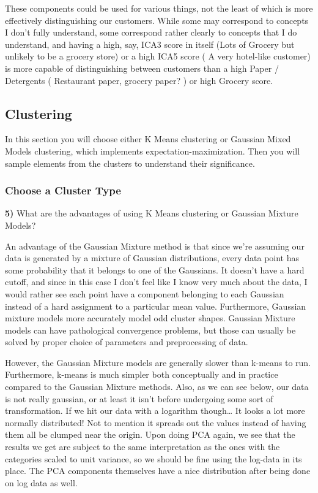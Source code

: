 \documentclass{article}
\begin{document}
These components could be used for various things, not the least of which is more effectively distinguishing our customers.  While some may correspond to concepts I don't fully understand, some correspond rather clearly to concepts that I do understand, and having a high, say, ICA3 score in itself (Lots of Grocery but unlikely to be a grocery store) or a high ICA5 score ( A very hotel-like customer) is more capable of distinguishing between customers than a high Paper / Detergents ( Restaurant paper, grocery paper? ) or high Grocery score.
    \subsection{Clustering}\label{clustering}

In this section you will choose either K Means clustering or Gaussian
Mixed Models clustering, which implements expectation-maximization. Then
you will sample elements from the clusters to understand their
significance.

    \subsubsection{Choose a Cluster Type}\label{choose-a-cluster-type}

\textbf{5)} What are the advantages of using K Means clustering or
Gaussian Mixture Models?

    An advantage of the Gaussian Mixture method is that since we're assuming
our data is generated by a mixture of Gaussian distributions, every data
point has some probability that it belongs to one of the Gaussians. It
doesn't have a hard cutoff, and since in this case I don't feel like I
know very much about the data, I would rather see each point have a
component belonging to each Gaussian instead of a hard assignment to a
particular mean value. Furthermore, Gaussian mixture models more
accurately model odd cluster shapes. Gaussian Mixture models can have
pathological convergence problems, but those can usually be solved by
proper choice of parameters and preprocessing of data.

However, the Gaussian Mixture models are generally slower than k-means
to run. Furthermore, k-means is much simpler both conceptually and in
practice compared to the Gaussian Mixture methods. Also, as we can see
below, our data is not really gaussian, or at least it isn't before
undergoing some sort of transformation. If we hit our data with a
logarithm though\ldots{} It looks a lot more normally distributed! Not
to mention it spreads out the values instead of having them all be
clumped near the origin. Upon doing PCA again, we see that the results
we get are subject to the same interpretation as the ones with the
categories scaled to unit variance, so we should be fine using the
log-data in its place. The PCA components themselves have a nice
distribution after being done on log data as well.
\end{document}
